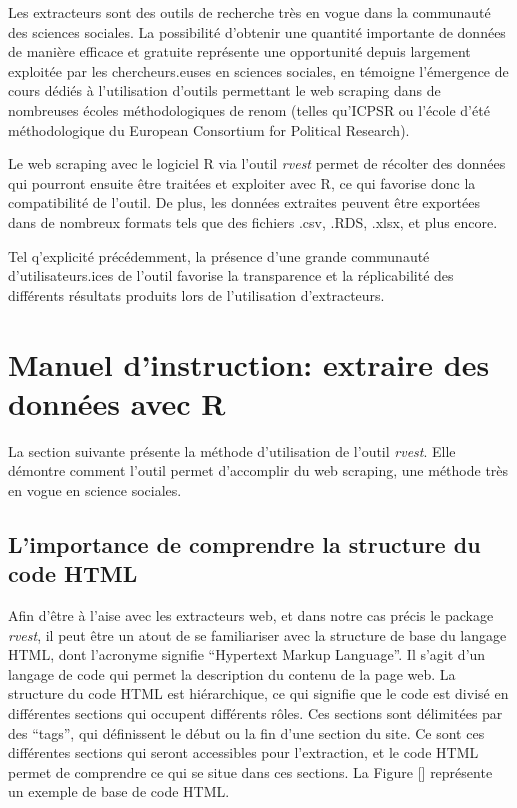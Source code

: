 \documentclass[
  letterpaper,
  DIV=11,
  numbers=noendperiod]{scrreprt}
\begin{document}
Les extracteurs sont des outils de recherche très en vogue dans la
communauté des sciences sociales. La possibilité d'obtenir une quantité
importante de données de manière efficace et gratuite représente une
opportunité depuis largement exploitée par les chercheurs.euses en
sciences sociales, en témoigne l'émergence de cours dédiés à
l'utilisation d'outils permettant le web scraping dans de nombreuses
écoles méthodologiques de renom (telles qu'ICPSR ou l'école d'été
méthodologique du European Consortium for Political Research).

Le web scraping avec le logiciel R via l'outil \emph{rvest} permet de
récolter des données qui pourront ensuite être traitées et exploiter
avec R, ce qui favorise donc la compatibilité de l'outil. De plus, les
données extraites peuvent être exportées dans de nombreux formats tels
que des fichiers .csv, .RDS, .xlsx, et plus encore.

Tel q'explicité précédemment, la présence d'une grande communauté
d'utilisateurs.ices de l'outil favorise la transparence et la
réplicabilité des différents résultats produits lors de l'utilisation
d'extracteurs.

\section{Manuel d'instruction: extraire des données avec
R}\label{manuel-dinstruction-extraire-des-donnuxe9es-avec-r}

La section suivante présente la méthode d'utilisation de l'outil
\emph{rvest}. Elle démontre comment l'outil permet d'accomplir du web
scraping, une méthode très en vogue en science sociales.

\subsection{L'importance de comprendre la structure du code
HTML}\label{limportance-de-comprendre-la-structure-du-code-html}

Afin d'être à l'aise avec les extracteurs web, et dans notre cas précis
le package \emph{rvest}, il peut être un atout de se familiariser avec
la structure de base du langage HTML, dont l'acronyme signifie
``Hypertext Markup Language''. Il s'agit d'un langage de code qui permet
la description du contenu de la page web. La structure du code HTML est
hiérarchique, ce qui signifie que le code est divisé en différentes
sections qui occupent différents rôles. Ces sections sont délimitées par
des ``tags'', qui définissent le début ou la fin d'une section du site.
Ce sont ces différentes sections qui seront accessibles pour
l'extraction, et le code HTML permet de comprendre ce qui se situe dans
ces sections. La Figure {[}{]} représente un exemple de base de code
HTML.
\end{document}
